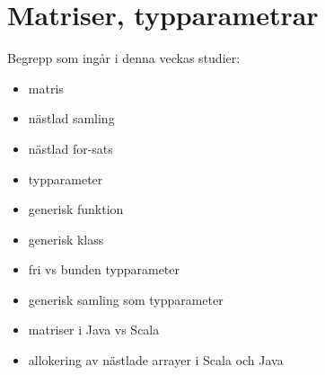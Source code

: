 \chapter{Matriser, typparametrar}\label{chapter:W08}
Begrepp som ingår i denna veckas studier:
\begin{itemize}[noitemsep,label={$\square$},leftmargin=*]
\item matris
\item nästlad samling
\item nästlad for-sats
\item typparameter
\item generisk funktion
\item generisk klass
\item fri vs bunden typparameter
\item generisk samling som typparameter
\item matriser i Java vs Scala
\item allokering av nästlade arrayer i Scala och Java\end{itemize}
